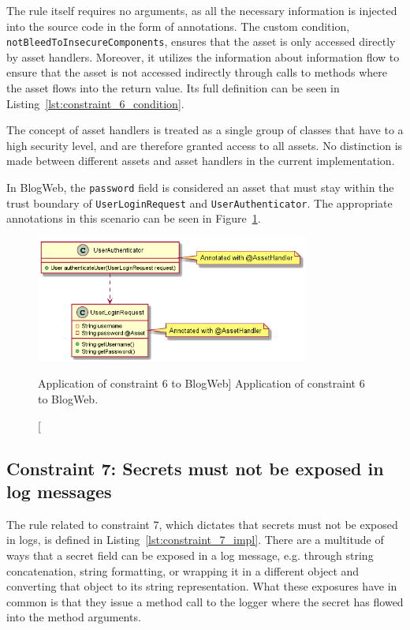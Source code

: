The rule itself requires no arguments, as all the necessary information is injected into the source code in the form of annotations. The custom condition, \texttt{notBleedTo\-InsecureComponents}, ensures that the asset is only accessed directly by asset handlers. Moreover, it utilizes the information about information flow to ensure that the asset is not accessed indirectly through calls to methods where the asset flows into the return value. Its full definition can be seen in Listing~\ref{lst:constraint_6_condition}.

The concept of asset handlers is treated as a single group of classes that have to a high security level, and are therefore granted access to all assets. No distinction is made between different assets and asset handlers in the current implementation.

In BlogWeb, the \texttt{password} field is considered an asset that must stay within the trust boundary of \texttt{UserLoginRequest} and \texttt{UserAuthenticator}. The appropriate annotations in this scenario can be seen in Figure~\ref{fig:assets_toy_system}.

\begin{figure}[ht]
    \centering
    \includegraphics[width=0.8\textwidth]{figure/toyexamples/Assets.png}
    \caption
        [Application of constraint 6 to BlogWeb]
        {Application of constraint 6 to BlogWeb.}
    \label{fig:assets_toy_system}
\end{figure}

\subsection{Constraint 7: Secrets must not be exposed in log messages}
The rule related to constraint 7, which dictates that secrets must not be exposed in logs, is defined in Listing~\ref{lst:constraint_7_impl}.
There are a multitude of ways that a secret field can be exposed in a log message, e.g. through string concatenation, string formatting, or wrapping it in a different object and converting that object to its string representation. What these exposures have in common is that they issue a method call to the logger where the secret has flowed into the method arguments.

